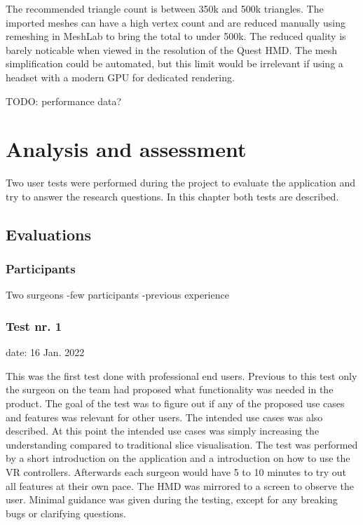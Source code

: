 \documentclass[a4paper]{report}
\begin{document}
The recommended triangle count is between 350k and 500k triangles\cite{noauthor_oculus_nodate}. The imported meshes can have a high vertex count and are reduced manually using remeshing in MeshLab\cite{cignoni_meshlab_2008} to bring the total to under 500k. The reduced quality is barely noticable when viewed in the resolution of the Quest HMD.
The mesh simplification could be automated, but this limit would be irrelevant if using a headset with a modern GPU for dedicated rendering.

TODO: performance data?

\chapter{Analysis and assessment}\label{analysis and assessment}

Two user tests were performed during the project to evaluate the application and try to answer the research questions. In this chapter both tests are described.

\section{Evaluations}

\subsection{Participants}
Two surgeons
-few participants
-previous experience


\subsection{Test nr. 1}
date: 16 Jan. 2022

This was the first test done with professional end users. Previous to this test only the surgeon on the team had proposed what functionality was needed in the product.
The goal of the test was to figure out if any of the proposed use cases and features was relevant for other users. 
The intended use cases was also described. At this point the intended use cases was simply increasing the understanding compared to traditional slice visualisation.
The test was performed by a short introduction on the application and a introduction on how to use the VR controllers. Afterwards each surgeon would have 5 to 10 minutes to try out all features at their own pace. The HMD was mirrored to a screen to observe the user. Minimal guidance was given during the testing, except for any breaking bugs or clarifying questions.
\end{document}
